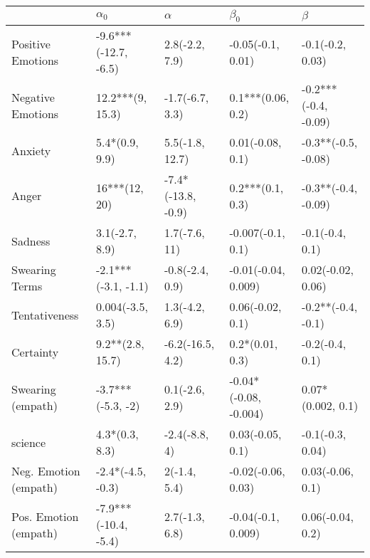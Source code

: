 \begin{tabular}{lllll}
\toprule
{} &            $\alpha_0$ &            $\alpha$ &              $\beta_0$ &               $\beta$ \\
\midrule
Positive Emotions     &  -9.6***(-12.7, -6.5) &      2.8(-2.2, 7.9) &      -0.05(-0.1, 0.01) &      -0.1(-0.2, 0.03) \\
Negative Emotions     &      12.2***(9, 15.3) &     -1.7(-6.7, 3.3) &      0.1***(0.06, 0.2) &  -0.2***(-0.4, -0.09) \\
Anxiety               &        5.4*(0.9, 9.9) &     5.5(-1.8, 12.7) &       0.01(-0.08, 0.1) &   -0.3**(-0.5, -0.08) \\
Anger                 &         16***(12, 20) &  -7.4*(-13.8, -0.9) &       0.2***(0.1, 0.3) &   -0.3**(-0.4, -0.09) \\
Sadness               &        3.1(-2.7, 8.9) &       1.7(-7.6, 11) &      -0.007(-0.1, 0.1) &       -0.1(-0.4, 0.1) \\
Swearing Terms        &   -2.1***(-3.1, -1.1) &     -0.8(-2.4, 0.9) &    -0.01(-0.04, 0.009) &     0.02(-0.02, 0.06) \\
Tentativeness         &      0.004(-3.5, 3.5) &      1.3(-4.2, 6.9) &       0.06(-0.02, 0.1) &    -0.2**(-0.4, -0.1) \\
Certainty             &      9.2**(2.8, 15.7) &    -6.2(-16.5, 4.2) &        0.2*(0.01, 0.3) &       -0.2(-0.4, 0.1) \\
Swearing (empath)     &     -3.7***(-5.3, -2) &      0.1(-2.6, 2.9) &  -0.04*(-0.08, -0.004) &     0.07*(0.002, 0.1) \\
science               &        4.3*(0.3, 8.3) &       -2.4(-8.8, 4) &       0.03(-0.05, 0.1) &      -0.1(-0.3, 0.04) \\
Neg. Emotion (empath) &     -2.4*(-4.5, -0.3) &        2(-1.4, 5.4) &     -0.02(-0.06, 0.03) &      0.03(-0.06, 0.1) \\
Pos. Emotion (empath) &  -7.9***(-10.4, -5.4) &      2.7(-1.3, 6.8) &     -0.04(-0.1, 0.009) &      0.06(-0.04, 0.2) \\
\bottomrule
\end{tabular}
